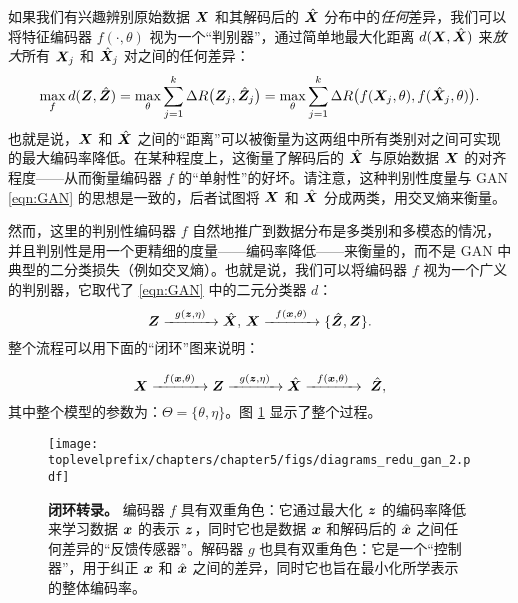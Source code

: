 \documentclass[../../book-main.tex]{subfiles}
\begin{document}
{如果我们有兴趣辨别原始数据 $\bm{X}$ 和其解码后的 $\hat {\bm{X}}$ 分布中的{\em 任何}差异，我们可以将特征编码器 $f(\cdot, \theta)$ 视为一个“判别器”，通过简单地最大化距离 $d(\bm{X}, \hat {\bm{X}})$ 来{\em 放大}所有 $\bm{X}_j$ 和 $\hat {\bm{X}}_j$ 对之间的任何差异：
\begin{equation}
\max_f d(\bm{Z}, \hat {\bm{Z}}) = \max_{\theta} \sum_{j=1}^k \Delta R\big(\bm{Z}_j, \hat{\bm{Z}}_j\big) = \max_{\theta} \sum_{j=1}^k \Delta R\big(f(\bm{X}_j,\theta), f(\hat{\bm{X}}_j,\theta)\big).
    \label{eqn:max-distance}
\end{equation}
也就是说，$\bm{X}$ 和 $\hat {\bm{X}}$ 之间的“距离”可以被衡量为这两组中所有类别对之间可实现的最大编码率降低。在某种程度上，这衡量了解码后的 $\hat {\bm{X}}$ 与原始数据 $\bm{X}$ 的对齐程度——从而衡量编码器 $f$ 的“单射性”的好坏。请注意，这种判别性度量与 GAN \eqref{eqn:GAN} 的思想是一致的，后者试图将 $\bm{X}$ 和 $\hat {\bm{X}}$ 分成两类，用交叉熵来衡量。

然而，这里的判别性编码器 $f$ 自然地推广到数据分布是多类别和多模态的情况，并且判别性是用一个更精细的度量——编码率降低——来衡量的，而不是 GAN 中典型的二分类损失（例如交叉熵）。也就是说，我们可以将编码器 $f$ 视为一个广义的判别器，它取代了 \eqref{eqn:GAN} 中的二元分类器 $d$：
\begin{equation}
 \bm{Z} \xrightarrow{\hspace{2mm} g(\bm{z},\eta) \hspace{2mm}} \hat {\bm{X}}, \, \bm{X} \xrightarrow{\hspace{2mm} f(\bm{x}, \theta)\hspace{2mm}} \{\hat {\bm{Z}}, \bm{Z}\}.
 \label{eqn:closed-loop-GAN}
\end{equation}
整个流程可以用下面的“闭环”图来说明：}
\begin{equation}
    \bm{X} \xrightarrow{\hspace{2mm} f(\bm{x}, \theta)\hspace{2mm}} \bm{Z} \xrightarrow{\hspace{2mm} g(\bm{z},\eta) \hspace{2mm}} \hat {\bm{X}} \xrightarrow{\hspace{2mm} f(\bm{x}, \theta)\hspace{2mm}} \ \hat {\bm{Z}}, 
\end{equation}
其中整个模型的参数为：$\Theta = \{\theta, \eta\}$。图 \ref{fig:auto-encoding-closed} 显示了整个过程。

\begin{figure}[t]
{\texttt{[image: \\toplevelprefix/chapters/chapter5/figs/diagrams\_redu\_gan\_2.pdf]}}
\caption{{\bf 闭环转录。} 编码器 $f$ 具有双重角色：它通过最大化 $\bm{z}$ 的编码率降低来学习数据 $\bm{x}$ 的表示 $\bm{z}$，同时它也是数据 $\bm{x}$ 和解码后的 $\hat {\bm{x}}$ 之间任何差异的“反馈传感器”。解码器 $g$ 也具有双重角色：它是一个“控制器”，用于纠正 $\bm{x}$ 和 $\hat {\bm{x}}$ 之间的差异，同时它也旨在最小化所学表示的整体编码率。} \label{fig:auto-encoding-closed} 
\end{figure}
\end{document}
